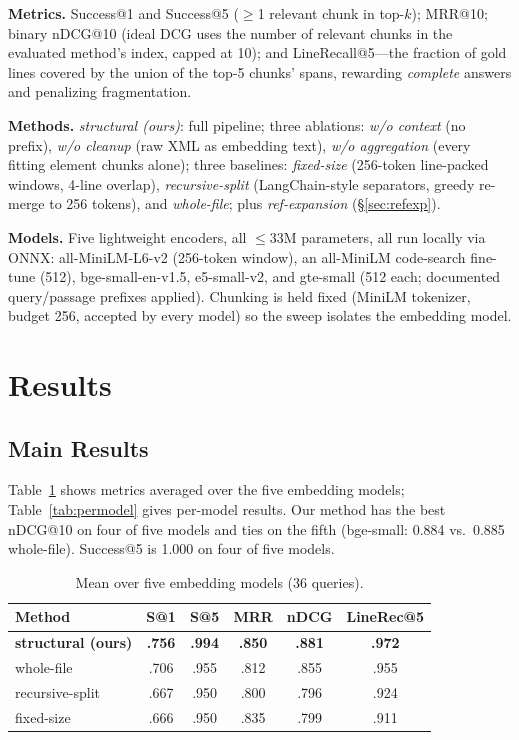 \documentclass[conference]{IEEEtran}
\begin{document}
\textbf{Metrics.} Success@1 and Success@5 ($\geq$1 relevant chunk in top-$k$); MRR@10; binary nDCG@10 (ideal DCG uses the number of relevant chunks in the evaluated method's index, capped at 10); and LineRecall@5---the fraction of gold lines covered by the union of the top-5 chunks' spans, rewarding \emph{complete} answers and penalizing fragmentation.

\textbf{Methods.} \emph{structural (ours)}: full pipeline; three ablations: \emph{w/o context} (no prefix), \emph{w/o cleanup} (raw XML as embedding text), \emph{w/o aggregation} (every fitting element chunks alone); three baselines: \emph{fixed-size} (256-token line-packed windows, 4-line overlap), \emph{recursive-split} (LangChain-style separators, greedy re-merge to 256 tokens), and \emph{whole-file}; plus \emph{ref-expansion} (\S\ref{sec:refexp}).

\textbf{Models.} Five lightweight encoders, all $\leq$33M parameters, all run locally via ONNX: all-MiniLM-L6-v2 (256-token window), an all-MiniLM code-search fine-tune (512), bge-small-en-v1.5, e5-small-v2, and gte-small (512 each; documented query/passage prefixes applied). Chunking is held fixed (MiniLM tokenizer, budget 256, accepted by every model) so the sweep isolates the embedding model.

\section{Results}\label{sec:results}

\subsection{Main Results}
Table~\ref{tab:summary} shows metrics averaged over the five embedding models; Table~\ref{tab:permodel} gives per-model results. Our method has the best nDCG@10 on four of five models and ties on the fifth (bge-small: 0.884 vs.\ 0.885 whole-file). Success@5 is 1.000 on four of five models.

\begin{table}[t]
\caption{Mean over five embedding models (36 queries).}
\label{tab:summary}
\centering
\begin{tabular}{lccccc}
\toprule
Method & S@1 & S@5 & MRR & nDCG & LineRec@5 \\
\midrule
\textbf{structural (ours)} & \textbf{.756} & \textbf{.994} & \textbf{.850} & \textbf{.881} & \textbf{.972} \\
whole-file        & .706 & .955 & .812 & .855 & .955 \\
recursive-split   & .667 & .950 & .800 & .796 & .924 \\
fixed-size        & .666 & .950 & .835 & .799 & .911 \\
\bottomrule
\end{tabular}
\end{table}
\end{document}
